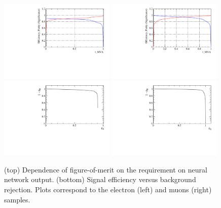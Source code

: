\begin{figure}[h!]
\centering
\includegraphics[width=0.49\textwidth]{RKst/figs/Optimisation/optimizeCut_EE-q2central/EE_Optimize_t_MVA.pdf}
\includegraphics[width=0.49\textwidth]{RKst/figs/Optimisation/optimizeCut_MM-q2central/MM_Optimize_t_MVA.pdf}
\includegraphics[width=0.49\textwidth]{RKst/figs/Optimisation/optimizeCut_EE-q2central/EE_ROC_t_MVA.pdf}
\includegraphics[width=0.49\textwidth]{RKst/figs/Optimisation/optimizeCut_MM-q2central/MM_ROC_t_MVA.pdf}
\caption{(top) Dependence of figure-of-merit on the requirement on neural network output.
(bottom) Signal efficiency versus background rejection.
Plots correspond to the electron (left) and muons (right) samples.}
\label{fig:RKst_FOM}
\end{figure}


